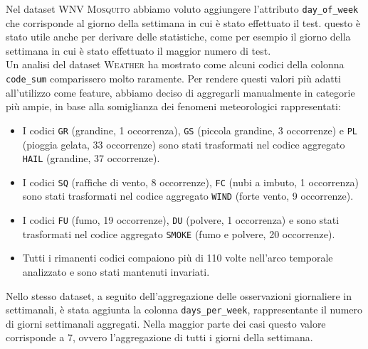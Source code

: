 
Nel dataset \textsc{WNV Mosquito} abbiamo voluto aggiungere l'attributo 
\texttt{day\_of\_week} che corrisponde al giorno della settimana in cui è stato 
effettuato il test. questo è stato utile anche per derivare delle statistiche, 
come per esempio il giorno della settimana in cui è stato effettuato il maggior 
numero di test. 
\\

Un analisi del dataset \textsc{Weather} ha mostrato come alcuni codici della 
colonna \texttt{code\_sum} comparissero molto raramente. Per rendere questi 
valori più adatti all'utilizzo come feature, abbiamo deciso di aggregarli 
manualmente in categorie più ampie, in base alla somiglianza dei fenomeni 
meteorologici rappresentati:
\begin{itemize}
	\item I codici \texttt{GR} (grandine, 1 occorrenza), \texttt{GS} (piccola 
	grandine, 3 occorrenze) e \texttt{PL} (pioggia gelata, 33 occorrenze) sono 
	stati trasformati nel codice aggregato \texttt{HAIL} (grandine, 37 
	occorrenze).
	
	\item I codici \texttt{SQ} (raffiche di vento, 8 occorrenze), \texttt{FC} 
	(nubi a imbuto, 1 occorrenza) sono stati trasformati nel codice aggregato 
	\texttt{WIND} (forte vento, 9 occorrenze).
	
	\item I codici \texttt{FU} (fumo, 19 occorrenze), \texttt{DU} (polvere, 1 
	occorrenza) e sono stati trasformati nel codice aggregato \texttt{SMOKE} 
	(fumo e polvere, 20 occorrenze).
	
	\item Tutti i rimanenti codici compaiono più di 110 volte nell'arco 
	temporale analizzato e sono stati mantenuti invariati.
\end{itemize}

Nello stesso dataset, a seguito dell'aggregazione delle osservazioni 
giornaliere in settimanali, è stata aggiunta la colonna 
\texttt{days\_per\_week}, rappresentante il numero di giorni settimanali 
aggregati. Nella maggior parte dei casi questo valore corrisponde a 7, ovvero 
l'aggregazione di tutti i giorni della settimana.

